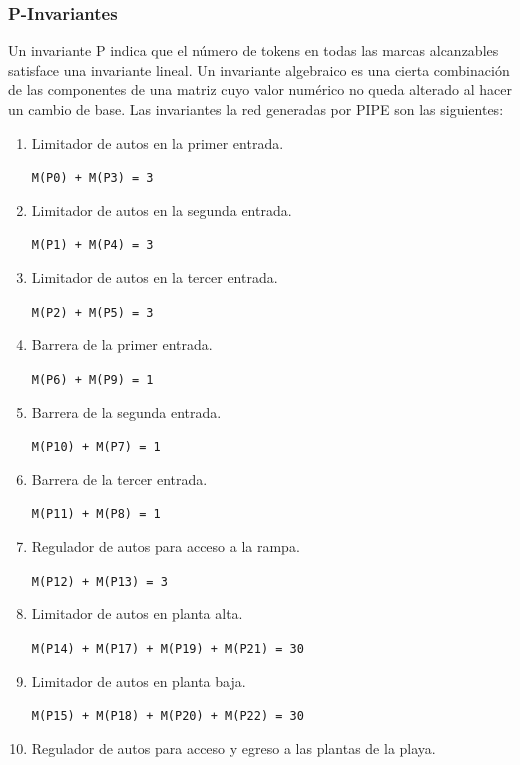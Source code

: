 \documentclass[12pt,a4paper]{article}
\begin{document}
\subsubsection{P-Invariantes}
Un invariante P indica que el número de tokens en todas las marcas alcanzables satisface una invariante lineal.
Un invariante algebraico es una cierta combinación de las componentes de una matriz cuyo valor numérico no queda alterado al hacer un cambio de base.
Las invariantes la red generadas por PIPE son las siguientes:

\begin{enumerate}
\item Limitador de autos en la primer entrada.

        \verb|M(P0) + M(P3) = 3|
        
\item Limitador de autos en la segunda entrada.

        \verb|M(P1) + M(P4) = 3 |

\item Limitador de autos en la tercer entrada.

        \verb|M(P2) + M(P5) = 3 |

\item Barrera de la primer entrada.

        \verb|M(P6) + M(P9) = 1|
        
\item Barrera de la segunda entrada.

        \verb|M(P10) + M(P7) = 1 |
        
\item Barrera de la tercer entrada.

        \verb|M(P11) + M(P8) = 1 |

\item Regulador de autos para acceso a la rampa.

        \verb|M(P12) + M(P13) = 3 |

\item Limitador de autos en planta alta.

        \verb|M(P14) + M(P17) + M(P19) + M(P21) = 30 |

\item Limitador de autos en planta baja.

        \verb|M(P15) + M(P18) + M(P20) + M(P22) = 30 |

\item Regulador de autos para acceso y egreso a las plantas de la playa.


\end{enumerate}
\end{document}
